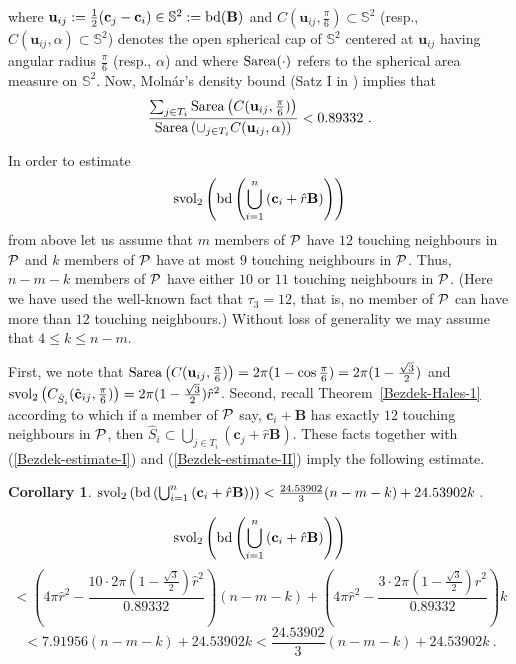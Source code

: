 \documentclass[10pt]{article}
\newtheorem{Corollary}{Corollary}
\numberwithin{Subcase}{Case}
\begin{document}
\noindent where $\mathbf{u}_{ij}:=\frac{1}{2}(\mathbf{c}_j-\mathbf{c}_i)\in \mathbb{S}^2:={\rm bd}(\mathbf{B})$ and $C(\mathbf{u}_{ij}, \frac{\pi}{6})\subset \mathbb{S}^2$ (resp., $C(\mathbf{u}_{ij}, \alpha)\subset \mathbb{S}^2$) denotes the open spherical cap of $\mathbb{S}^2$ centered at $\mathbf{u}_{ij}$ having angular radius $\frac{\pi}{6}$ (resp., $\alpha$)
and where ${\rm Sarea}(\cdot)$ refers to the spherical area measure on $\mathbb{S}^2$. Now, Moln\'ar's density bound (Satz I in \cite{Mo65}) implies that
\begin{equation}\label{Bezdek-estimate-II}
\frac{\sum_{j\in T_i}{\rm Sarea}\left(C(\mathbf{u}_{ij}, \frac{\pi}{6})\right)}{{\rm Sarea}\left(\cup_{j\in T_i}C(\mathbf{u}_{ij}, \alpha)\right)}<0.89332\ .
\end{equation}

In order to estimate $${\rm svol}_2\left({\rm bd}\left(\bigcup_{i=1}^n\left(\mathbf{c}_i+\hat{r}\mathbf{B}\right)\right)\right)$$ from above let us assume that $m$ members of ${\cal P}$ have $12$ touching neighbours in ${\cal P}$ and $k$ members of ${\cal P}$ have at most $9$ touching neighbours in ${\cal P}$. Thus, $n-m-k$ members of ${\cal P}$ have either $10$ or $11$ touching neighbours in ${\cal P}$. (Here we have used the well-known fact that $\tau_3=12$, that is, no member of ${\cal P}$ can have more than $12$ touching neighbours.) Without loss of generality we may assume that $4\le k\le n-m$. 

First, we note that ${\rm Sarea}\left(C(\mathbf{u}_{ij}, \frac{\pi}{6})\right)=2\pi(1-\cos\frac{\pi}{6})=2\pi(1-\frac{\sqrt{3}}{2})$ and ${\rm svol}_2\left(C_{\hat{S}_i}(\hat{\mathbf{c}}_{ij}, \frac{\pi}{6})\right)=2\pi(1-\frac{\sqrt{3}}{2})\hat{r}^2$. Second, recall Theorem~\ref{Bezdek-Hales-1} according to which if a member of ${\cal P}$ say, $\mathbf{c}_i+\mathbf{B}$ has exactly $12$ touching neighbours in ${\cal P}$, then $\hat{S}_i\subset \bigcup_{j\in T_i}(\mathbf{c}_j+\hat{r}\mathbf{B})$. These facts together with (\ref{Bezdek-estimate-I}) and (\ref{Bezdek-estimate-II}) imply the following estimate.

\begin{Corollary}\label{upper-bound-for-surface-area-in-3D}
${\rm svol}_2\left({\rm bd}\left(\bigcup_{i=1}^n\left(\mathbf{c}_i+\hat{r}\mathbf{B}\right)\right)\right)< 
\frac{24.53902}{3} (n-m-k)+24.53902k \ .
$
\end{Corollary}

\proof
$${\rm svol}_2\left({\rm bd}\left(\bigcup_{i=1}^n\left(\mathbf{c}_i+\hat{r}\mathbf{B}\right)\right)\right)$$
$$<\left(4\pi\hat{r}^2-\frac{10\cdot2\pi(1-\frac{\sqrt{3}}{2})\hat{r}^2}{0.89332}\right)(n-m-k)
+\left(4\pi\hat{r}^2-\frac{3\cdot2\pi(1-\frac{\sqrt{3}}{2})\hat{r}^2}{0.89332}\right)k$$
$$<7.91956(n-m-k)+24.53902k
<\frac{24.53902}{3}(n-m-k)+24.53902k\ .$$ 
\endproof
\end{document}

